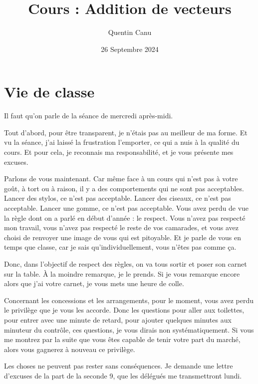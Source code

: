 \documentclass{article}
\title{Cours : Addition de vecteurs}
\date{26 Septembre 2024}
\author{Quentin Canu}
\begin{document}
\maketitle

\section{Vie de classe}

Il faut qu'on parle de la séance de mercredi après-midi.

Tout d'abord, pour être transparent, je n'étais pas au meilleur de ma forme. Et vu la séance, j'ai laissé la frustration l'emporter, ce qui a nuis à la qualité du cours. Et pour cela, je reconnais ma responsabilité, et je vous présente mes excuses.

Parlons de vous maintenant. Car même face à un cours qui n'est pas à votre goût, à tort ou à raison, il y a des comportements qui ne sont pas acceptables. Lancer des stylos, ce n'est pas acceptable. Lancer des ciseaux, ce n'est pas acceptable. Lancer une gomme, ce n'est pas acceptable. Vous avez perdu de vue la règle dont on a parlé en début d'année : le respect. Vous n'avez pas respecté mon travail, vous n'avez pas respecté le reste de vos camarades, et vous avez choisi de renvoyer une image de vous qui est pitoyable. Et je parle de vous en temps que classe, car je sais qu'individuellement, vous n'êtes pas comme ça.

Donc, dans l'objectif de respect des règles, on va tous sortir et poser son carnet sur la table. À la moindre remarque, je le prends. Si je vous remarque encore alors que j'ai votre carnet, je vous mets une heure de colle.

Concernant les concessions et les arrangements, pour le moment, vous avez perdu le privilège que je vous les accorde. Donc les questions pour aller aux toilettes, pour entrer avec une minute de retard, pour ajouter quelques minutes aux minuteur du contrôle, ces questions, je vous dirais non systématiquement. Si vous me montrez par la suite que vous êtes capable de tenir votre part du marché, alors vous gagnerez à nouveau ce privilège.

Les choses ne peuvent pas rester sans conséquences. Je demande une lettre d'excuses de la part de la seconde 9, que les délégués me transmettront lundi.
\end{document}
